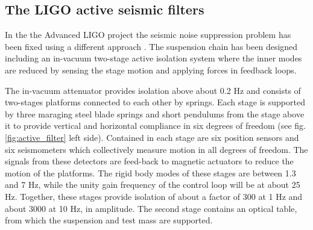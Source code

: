 
%

\subsection{The LIGO active seismic filters}
\label{sec:LIGO_filters}


In the the Advanced LIGO project the seismic noise suppression problem has been fixed using
a different approach \cite{aLIGO}. The suspension chain has been designed including 
an in-vacuum two-stage active isolation system where the inner modes are reduced by sensing 
the stage motion and applying forces in feedback loops. 

The in-vacuum attenuator provides isolation above about 0.2 Hz and consists of two-stages 
platforms connected to each other by springs. Each stage is supported by three maraging 
steel blade springs and short pendulums from the stage above it to provide vertical and 
horizontal compliance in six degrees of freedom (see fig. \ref{fig:active_filter} left side). 
Contained in each stage are six position sensors and six seismometers which collectively measure 
motion in all degrees of freedom. The signals from these detectors are feed-back to magnetic 
actuators to reduce the motion of the platforms. The rigid body modes of these stages are 
between 1.3 and 7 Hz, while the unity gain frequency of the control loop will be at about 25 Hz. 
Together, these stages provide isolation of about a factor of 300 at 1 Hz and about 3000 at 10 Hz, 
in amplitude. The second stage contains an optical table, from which the suspension and test 
mass are supported.

